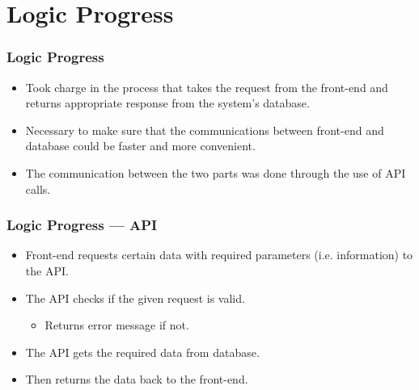 \documentclass[aspectratio=169, t]{beamer}
\begin{document}
\section{Logic Progress}
\begin{frame}
  \frametitle{Logic Progress}

\begin{itemize}
    \item Took charge in the process that takes the request from the front-end and returns appropriate response from the system's database.
    \item Necessary to make sure that the communications between front-end and database could be faster and more convenient.
    \item The communication between the two parts was done through the use of API calls.
\end{itemize}

\end{frame}

\begin{frame}
    \frametitle{Logic Progress --- API}

\begin{itemize}
    \item Front-end requests certain data with required parameters (i.e. information) to the API.
    \item The API checks if the given request is valid.
    \begin{itemize}
        \item Returns error message if not.
    \end{itemize}
    \item The API gets the required data from database.
    \item Then returns the data back to the front-end.
\end{itemize}

\end{frame}
\end{document}
